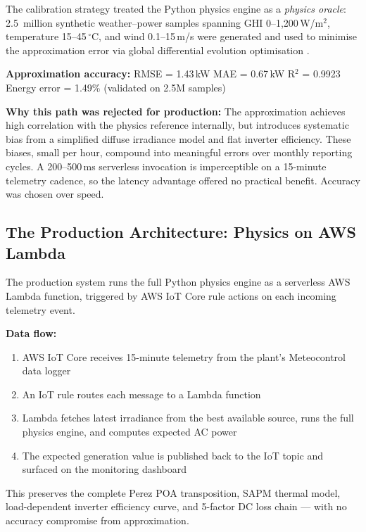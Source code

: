 \documentclass[11pt, a4paper]{article}
\newcommand{\kw}[1]{\textit{#1}}
\begin{document}
The calibration strategy treated the Python physics engine as a
\kw{physics oracle}: 2.5~million synthetic weather--power samples spanning
GHI 0--1{,}200\,W/m$^2$, temperature 15--45\,$^\circ$C, and wind 0.1--15\,m/s
were generated and used to minimise the approximation error via global
differential evolution optimisation \cite{storn1997differential}.

\begin{statbox}
\centering
\textbf{Approximation accuracy:} RMSE = 1.43\,kW \quad MAE = 0.67\,kW \quad
R$^2$ = 0.9923 \quad Energy error = 1.49\% \quad (validated on 2.5M samples)
\end{statbox}

\textbf{Why this path was rejected for production:} The approximation achieves
high correlation with the physics reference internally, but introduces systematic
bias from a simplified diffuse irradiance model and flat inverter efficiency.
These biases, small per hour, compound into meaningful errors over monthly
reporting cycles. A 200--500\,ms serverless invocation is imperceptible on a
15-minute telemetry cadence, so the latency advantage offered no practical
benefit. Accuracy was chosen over speed.

\subsection{The Production Architecture: Physics on AWS Lambda}\label{sec:aws}

The production system runs the full Python physics engine as a serverless
AWS Lambda function, triggered by AWS IoT Core rule actions on each
incoming telemetry event.

\textbf{Data flow:}
\begin{enumerate}
  \item AWS IoT Core receives 15-minute telemetry from the plant's Meteocontrol
    data logger
  \item An IoT rule routes each message to a Lambda function
  \item Lambda fetches latest irradiance from the best available source,
    runs the full physics engine, and computes expected AC power
  \item The expected generation value is published back to the IoT topic
    and surfaced on the monitoring dashboard
\end{enumerate}

This preserves the complete Perez POA transposition, SAPM thermal model,
load-dependent inverter efficiency curve, and 5-factor DC loss chain ---
with no accuracy compromise from approximation.
\end{document}

